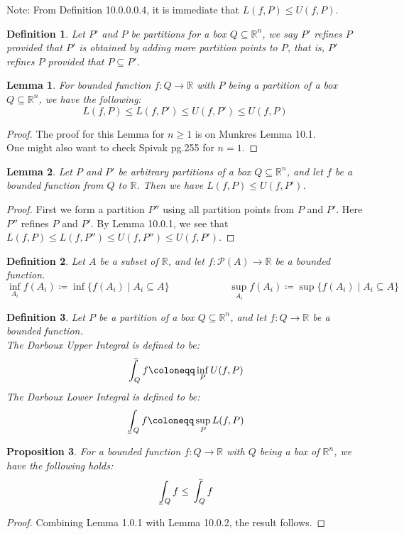 \documentclass[11pt,oneside]{book}
\theoremstyle{break}
\theoremstyle{break}
\newtheorem{lem}{Lemma}[thm]
\newtheorem{prop}[lem]{Proposition}
\newtheorem{defn}{Definition}[corL]
\def\upint{\mathchoice%
    {\mkern13mu\overline{\vphantom{\intop}\mkern7mu}\mkern-20mu}%
    {\mkern7mu\overline{\vphantom{\intop}\mkern7mu}\mkern-14mu}%
    {\mkern7mu\overline{\vphantom{\intop}\mkern7mu}\mkern-14mu}%
    {\mkern7mu\overline{\vphantom{\intop}\mkern7mu}\mkern-14mu}%
  \int}
\def\lowint{\mkern3mu\underline{\vphantom{\intop}\mkern7mu}\mkern-10mu\int}
\newcommand{\R}{\mathbb{R}}
\newcommand{\Power}{\mathcal{P}}
\newcommand{\note}{\color{red}Note: \color{black}}
\begin{document}
\note From Definition 10.0.0.0.4, it is immediate that $L(f,P) \leq U(f,P)$.

\begin{defn}
Let $P'$ and $P$ be partitions for  a box $Q\subseteq \R^n$, we say $P'$ refines $P$ provided that $P'$ is obtained by adding more partition points to $P$, that is, $P'$ refines $P$ provided that $P \subseteq P'$.  
\end{defn}


\begin{lem}
For bounded function $f:Q \to \R$ with $P$ being a partition of a box $Q\subseteq \R^n$, we have the following:
$$L(f,P) \leq L(f,P') \leq U(f,P') \leq U(f,P)$$
\end{lem}
\begin{proof}
The proof for this Lemma for $n\geq 1$ is on Munkres Lemma 10.1.\\ One might also want to check Spivak pg.255 for $n=1$.
\end{proof}

\begin{lem}
Let $P$ and $P'$ be arbitrary partitions of a box $Q\subseteq \R^n$, and let $f$ be a bounded function from $Q$ to $\R$. Then we have $L(f,P) \leq U(f,P')$. 
\end{lem}
\begin{proof}
First we form a partition $P''$ using all partition points from $P$ and $P'$. Here $P''$ refines $P$ and $P'$. By Lemma 10.0.1, we see that $L(f,P) \leq L(f,P'') \leq U(f,P'') \leq U(f,P')$.
\end{proof}


\begin{defn}
Let $A$ be a subset of $\R$, and let $f:\Power(A) \to \R$ be a bounded function.
$$\inf_{A_i} f(A_i) \coloneqq \inf\{f(A_i) \mid A_i \subseteq A\} \qquad\qquad\qquad \sup_{A_i} f(A_i) \coloneqq \sup\{f(A_i) \mid A_i \subseteq A\}$$
\end{defn}

\begin{defn}
Let $P$ be a partition of a box $Q \subseteq \R^n$, and let $f:Q \to \R$ be a bounded function.\\
The Darboux Upper Integral is defined to be:
$$\upint_Q f \coloneqq \inf_P U(f,P)$$
The Darboux Lower Integral is defined to be:
$$\lowint_Q f \coloneqq \sup_P L(f,P)$$
\end{defn}

\begin{prop}
For a bounded function $f:Q \to \R$ with $Q$ being a box of $\R^n$, we have the following holds: 
$$\lowint_Q f \leq \upint_Q f$$
\end{prop}
\begin{proof}
Combining Lemma 1.0.1 with Lemma 10.0.2, the result follows.
\end{proof}
\end{document}

